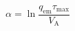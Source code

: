 \documentclass[a5paper]{article}
\begin{document}
\LARGE
\pagestyle{empty}
\[
\alpha = \ln \frac{q_\mathrm{em}\tau_\mathrm{max}}{V_\mathrm{A}}
\]
\end{document}
